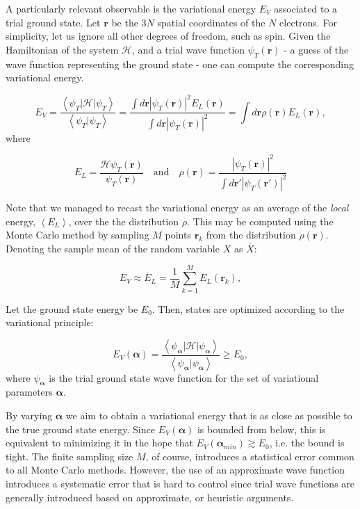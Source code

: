 A particularly relevant observable is the variational energy $E_V$ associated to a trial ground state.
Let $\bm r$ be the $3N$ spatial coordinates of the $N$ electrons.
For simplicity, let us ignore all other degrees of freedom, such as spin.
Given the Hamiltonian of the system $\mathcal{H}$, and a trial wave function $\psi_T (\bm r)$ - a guess of the wave function representing the ground state - one can compute the corresponding variational energy.

\begin{equation}\label{eq:variational_energy}
E_V = \frac{\left\langle \psi_T | \mathcal{H} | \psi_T \right \rangle}{\left\langle \psi_T | \psi_T \right \rangle} = \frac{ \int d\bm r |\psi_T (\bm r)|^2 E_L (\bm r)}{\int d\bm r | \psi_T (\bm r)|^2 } = \int d\bm r\rho (\bm r) E_L (\bm r) ,
\end{equation}
where

\begin{equation}\label{eq:local_energy}
E_L = \frac{\mathcal{H} \psi_T (\bm r) }{\psi_T (\bm r)}   \quad \text{and} \quad \rho (\bm r) = \frac{ | \psi_T (\bm r) |^2}{ \int d\bm r' | \psi_T (\bm r') |^2}
\end{equation}

Note that we managed to recast the variational energy as an average of the \emph{local} energy, $\left\langle E_L \right\rangle $, over the the distribution $\rho$.
This may be computed using the Monte Carlo method by sampling $M$ points $\bm r_k$ from the distribution $\rho (\bm r)$.
Denoting the sample mean of the random variable $X$ as $\overline {X}$:

\begin{equation}\label{eq:average}
E_V \approx \overline{E}_L = \frac{1}{M} \sum_{k= 1}^{M} E_L (\bm r_k) ,
\end{equation}

Let the ground state energy be $E_0$.
Then, states are optimized according to the variational principle:

\begin{equation}
E_V(\bm \alpha) = \frac{\left\langle \psi_{\bm \alpha} | \mathcal{H} | \psi_{\bm \alpha} \right\rangle}{\left\langle\psi_{\bm \alpha} | \psi_{\bm \alpha} \right\rangle} \ge E_0,
\end{equation}
where $\psi_{\bm \alpha}$ is the trial ground state wave function for the set of variational parameters ${\bm \alpha}$.

By varying $\bm \alpha$ we aim to obtain a variational energy that is as close as possible to the true ground state energy.
Since $E_V(\bm \alpha)$ is bounded from below, this is equivalent to minimizing it in the hope that $E_V(\bm \alpha_{min}) \gtrsim E_0$, i.e. the bound is tight.
The finite sampling size $M$, of course, introduces a statistical error common to all Monte Carlo methods. 
However, the use of an approximate wave function introduces a systematic error that is hard to control since trial wave functions are generally introduced based on approximate, or heuristic arguments.

